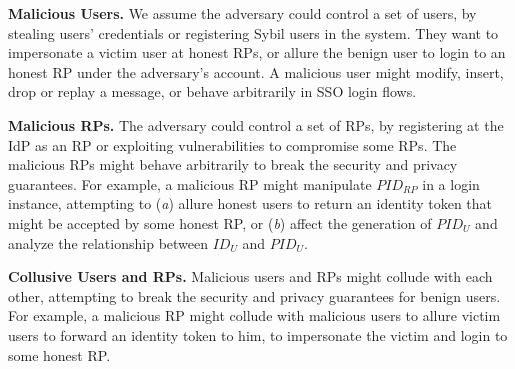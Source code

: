 
\vspace{0.5mm}
\noindent \textbf{Malicious Users.}
We assume the adversary could control a set of users,
 by stealing users' credentials or registering Sybil users in the system.
They want to impersonate a victim user at honest RPs, or allure the benign user to login to an honest RP under the adversary's account.
A malicious user might
    modify, insert, drop or replay a message, or behave arbitrarily in SSO login flows.



\vspace{0.5mm}
\noindent \textbf{Malicious RPs.}
The adversary could control a set of RPs, by registering at the IdP as an RP
     or exploiting vulnerabilities to compromise some RPs.
The malicious RPs might behave arbitrarily to break the security and privacy guarantees.
For example,
a malicious RP might manipulate $PID_{RP}$ in a login instance,
    attempting to (\emph{a}) allure honest users to return an identity token that might be accepted by some honest RP,
or (\emph{b}) affect the generation of $PID_U$ and
    analyze the relationship between $ID_U$ and $PID_U$.


\vspace{0.5mm}
\noindent \textbf{Collusive Users and RPs.}
Malicious users and RPs might collude with each other,
 attempting to break the security and privacy guarantees for benign users.
For example, a malicious RP might collude with malicious users to allure victim users to forward an identity token to him,
    to impersonate the victim and login to some honest RP.

